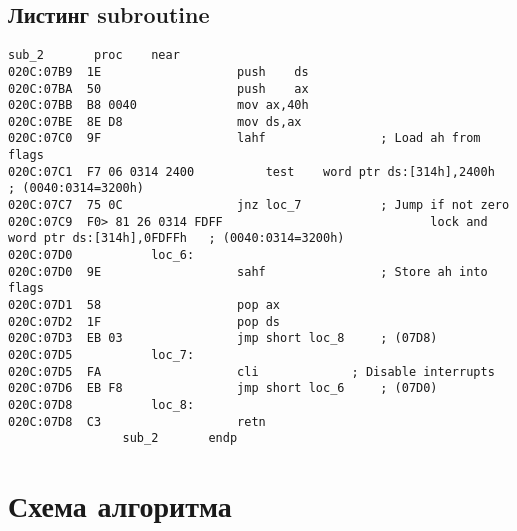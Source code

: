 \subsection*{Листинг subroutine} 
\begin{lstlisting}[style={asm}]
				sub_2		proc	near
020C:07B9  1E					push	ds
020C:07BA  50					push	ax
020C:07BB  B8 0040				mov	ax,40h
020C:07BE  8E D8				mov	ds,ax
020C:07C0  9F					lahf				; Load ah from flags
020C:07C1  F7 06 0314 2400			test	word ptr ds:[314h],2400h	; (0040:0314=3200h)
020C:07C7  75 0C				jnz	loc_7			; Jump if not zero
020C:07C9  F0> 81 26 0314 FDFF	                           lock	and	word ptr ds:[314h],0FDFFh	; (0040:0314=3200h)
020C:07D0			loc_6:
020C:07D0  9E					sahf				; Store ah into flags
020C:07D1  58					pop	ax
020C:07D2  1F					pop	ds
020C:07D3  EB 03				jmp	short loc_8		; (07D8)
020C:07D5			loc_7:
020C:07D5  FA					cli				; Disable interrupts
020C:07D6  EB F8				jmp	short loc_6		; (07D0)
020C:07D8			loc_8:
020C:07D8  C3					retn
				sub_2		endp
\end{lstlisting}

\newpage
\section*{Схема алгоритма}


